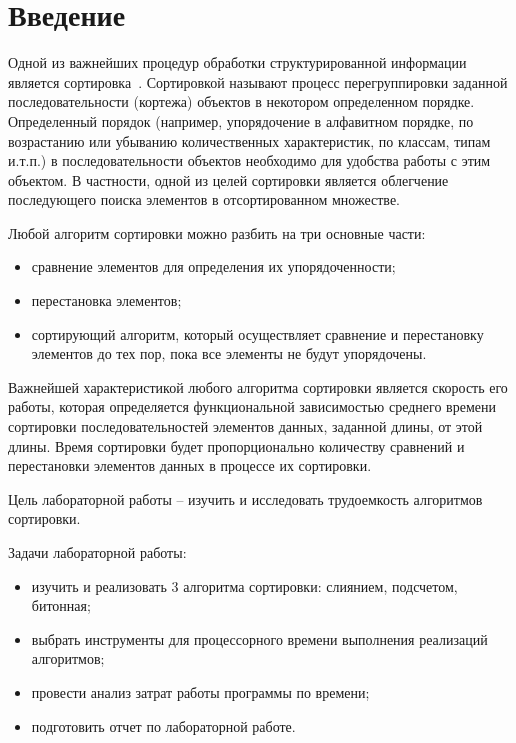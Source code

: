 \chapter*{Введение}

Одной из важнейших процедур обработки структурированной информации является сортировка~\cite{knut}. Сортировкой называют процесс перегруппировки заданной последовательности (кортежа) объектов в некотором определенном порядке. Определенный порядок (например, упорядочение в алфавитном порядке, по возрастанию или убыванию количественных характеристик, по классам, типам и.т.п.) в последовательности объектов необходимо для удобства работы с этим объектом. В частности, одной из целей сортировки является облегчение последующего поиска элементов в отсортированном множестве. 

Любой алгоритм сортировки можно разбить на три основные части:
\begin{itemize}
	\item сравнение элементов для определения их упорядоченности;
	\item перестановка элементов;
	\item сортирующий алгоритм, который осуществляет сравнение и перестановку элементов до тех пор, пока все элементы не будут упорядочены.
\end{itemize}

Важнейшей характеристикой любого алгоритма сортировки является скорость его работы, которая определяется функциональной зависимостью среднего времени сортировки последовательностей элементов данных, заданной длины, от этой длины. Время сортировки будет пропорционально количеству сравнений и перестановки элементов данных в процессе их сортировки.

Цель лабораторной работы -- изучить и исследовать трудоемкость алгоритмов сортировки.

Задачи лабораторной работы:
\begin{itemize}
	\item изучить и реализовать 3 алгоритма сортировки: слиянием, подсчетом, битонная;
	\item выбрать инструменты для процессорного времени выполнения реализаций алгоритмов;
	\item провести анализ затрат работы программы по времени;
	\item подготовить отчет по лабораторной работе.
\end{itemize}
